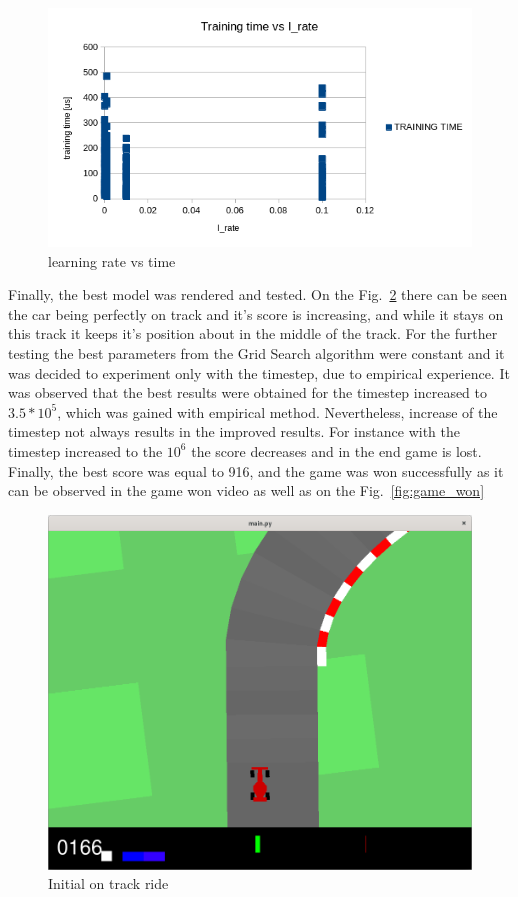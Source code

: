 \documentclass[runningheads]{llncs}
\begin{document}
\begin{figure}
  \includegraphics[width=\textwidth]{Screenshots/rate_vs_time.png}
  \caption{learning rate vs time}
  \label{fig:time}
\end{figure}

Finally, the best model was rendered and tested. On the Fig.~\ref{fig:on_track} there can be seen the car being perfectly on track and it's score is increasing, and while it stays on this track it keeps it's position about in the middle of the track. For the further testing the best parameters from the Grid Search algorithm were constant and it was decided to experiment only with the timestep, due to empirical experience. It was observed that the best results were obtained for the timestep increased to $3.5 * 10^5$, which was gained with empirical method. Nevertheless, increase of the timestep not always results in the improved results. For instance with the timestep increased to the $10^6$ the score decreases and in the end game is lost. Finally, the best score was equal to 916, and the game was won successfully as it can be observed in the game won video as well as on the Fig.~\ref{fig:game_won}
\begin{figure}
  \includegraphics[width=\textwidth]{Screenshots/on_track.png}
  \caption{Initial on track ride}
  \label{fig:on_track}
\end{figure}
\end{document}
